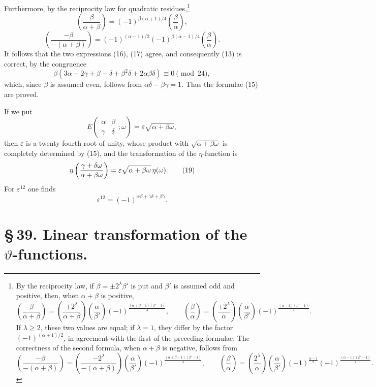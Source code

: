 \documentclass[11pt]{article}
\newcommand{\Jac}[2]{\left(\frac{#1}{#2}\right)}
\begin{document}
Furthermore, by the reciprocity law for quadratic residues,\footnote{By the reciprocity law, if $\beta=\pm2^\lambda\beta'$ is put and $\beta'$ is assumed odd and positive, then, when $\alpha+\beta$ is positive,
\[
\Jac{\beta}{\alpha+\beta}=\Jac{\pm2^\lambda}{\alpha+\beta}\Jac{\alpha}{\beta'}(-1)^{\frac{(\alpha+\beta-1)(\beta'-1)}{4}},
\qquad
\Jac{\beta}{\alpha}=\Jac{\pm2^\lambda}{\alpha}\Jac{\alpha}{\beta'}(-1)^{\frac{(\alpha-1)(\beta'-1)}{4}}.
\]
If $\lambda\ge2$, these two values are equal; if $\lambda=1$, they differ by the factor $(-1)^{(\alpha+1)/2}$, in agreement with the first of the preceding formulae. The correctness of the second formula, when $\alpha+\beta$ is negative, follows from
\[
\Jac{-\beta}{-(\alpha+\beta)}=\Jac{-2^\lambda}{-(\alpha+\beta)}\Jac{\alpha}{\beta'}(-1)^{\frac{(\alpha+\beta-1)(\beta'-1)}{4}},
\qquad
\Jac{\beta}{\alpha}=\Jac{2^\lambda}{\alpha}\Jac{\alpha}{\beta'}(-1)^{\frac{\alpha-1}{2}}(-1)^{\frac{(\alpha-1)(\beta'-1)}{4}}.
\]
}
\[
\Jac{\beta}{\alpha+\beta}=(-1)^{\beta(\alpha+1)/4}\Jac{\beta}{\alpha},
\]
\[
\Jac{-\beta}{-(\alpha+\beta)}=(-1)^{(\alpha-1)/2}(-1)^{\beta(\alpha-1)/4}\Jac{\beta}{\alpha}.
\]
It follows that the two expressions (16), (17) agree, and consequently (13) is correct, by the congruence
\[
\beta(3\alpha-2\gamma+\beta-\delta+\beta^2\delta+2\alpha\beta\delta)
\equiv0\pmod{24},
\]
which, since $\beta$ is assumed even, follows from $\alpha\delta-\beta\gamma=1$. Thus the formulae (15) are proved.

If we put
\begin{equation}
E\left(\begin{matrix}\alpha&\beta\\\gamma&\delta\end{matrix};\omega\right)
=\varepsilon\sqrt{\alpha+\beta\omega},
\tag{18}
\end{equation}
then $\varepsilon$ is a twenty-fourth root of unity, whose product with $\sqrt{\alpha+\beta\omega}$ is completely determined by (15), and the transformation of the $\eta$-function is
\begin{equation}
\eta\left({\gamma+\delta\omega\over\alpha+\beta\omega}\right)
=\varepsilon\sqrt{\alpha+\beta\omega}\,\eta(\omega).
\tag{19}
\end{equation}
For $\varepsilon^{12}$ one finds
\begin{equation}
\varepsilon^{12}=(-1)^{\alpha\beta+\gamma\delta+\beta\gamma}.
\tag{20}
\end{equation}

\section*{\S\,39. Linear transformation of the $\vartheta$-functions.}
\end{document}
